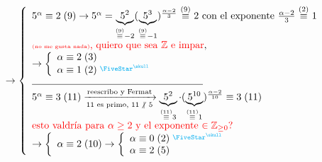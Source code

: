 \documentclass[12pt,a4paper, spanish]{article}
\begin{document}
$\to
	\llave{l}{

	\congruencia{5^\alpha}{2}{9}
	\to
	5^\alpha =
	\ub{5^2}{\conga9 -2} (\ub{5^{3}}{\conga9 -1})^\frac{\alpha - 2}{3}
	\conga9 2 \text{ con el exponente } \frac{\alpha - 2 }{3} \conga2 1 \\
	\red{{\tiny (no me gusta nada)}, quiero que sea $\enteros$ e impar},\\ \to
	\llave{l}{
		\congruencia{\alpha}{2}{3}\\
		\congruencia{\alpha}{1}{2} \llamada{\skull} \\
	}\\
	\separadorCorto

	\congruencia{5^\alpha}{3}{11}
	\flecha{reescribo y Fermat}[11 es primo, $11\noDivide 5$]
	\congruencia{\ub{5^2}{\conga{11} 3} \cdot (\ub{5^{10}}{\conga{11} 1})^{\frac{\alpha - 2}{10}}}{3}{11}\\
	\red{esto valdría para $\alpha \geq 2$ y el exponente $\en \enteros_{\geq 0}$?}\\
	\to
	\llave{l}{
		\congruencia{\alpha}{2}{10}
		\to
		\llave{l}{
			\congruencia{\alpha}{0}{2}\llamada{\skull}\\
			\congruencia{\alpha}{2}{5}

		}
	}
	}$
\end{document}
